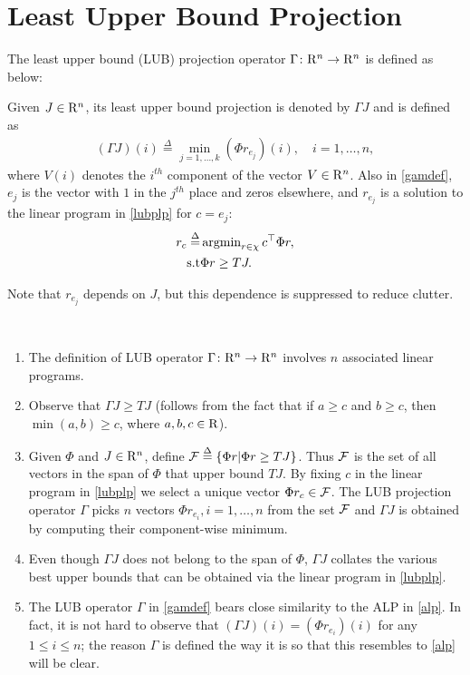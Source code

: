 \section{Least Upper Bound Projection}\label{sec:lubp}
The least upper bound (LUB) projection operator $\Gamma \colon \mathrm{R}^n \rightarrow\mathrm{R}^n$ is defined as below:
\begin{definition}\label{lubpop}
Given $J\in \mathrm{R}^n$, its least upper bound projection is denoted by $\Gamma J$ and is defined as 
\begin{align}\label{gamdef}
(\Gamma J)(i)\stackrel{\Delta}{=}\underset{j=1,\ldots,k}{\min} (\Phi r_{e_j})(i),\quad i=1,\ldots,n,
\end{align}
where $V(i)$ denotes the $i^{th}$ component of the vector $V\in \mathrm{R}^n$. Also in \eqref{gamdef}, $e_j$ is the vector with $1$ in the $j^{th}$ place and zeros elsewhere, and $r_{e_j}$ is a solution to the linear program in \eqref{lubplp} for $c=e_j$:
\begin{align}\label{lubplp}
 r_c   \stackrel{\Delta}{=}& \argmin_{r\in \chi} c^\top \Phi r,\nn\\
 \text{s.t}& \mb \Phi r\geq  TJ.
\end{align}
\end{definition}
Note that $r_{e_j}$ depends on $J$, but this dependence is suppressed to reduce clutter. 
\vspace{-10pt}
\begin{remark}
\mb\\
\vspace{-10pt}
\begin{enumerate}
\item The definition of LUB operator $\Gamma \colon \mathrm{R}^n \rightarrow \mathrm{R}^n$ involves $n$ associated linear programs.
\item Observe that $\Gamma J\geq TJ$ (follows from the fact that if $a\geq c$ and $b\geq c$, then $\min(a,b)\geq c$, where $a, b, c \in \mathrm{R}$).
\item Given $\Phi$ and $J\in \mathrm{R}^n$, define $\mathcal{F}\stackrel{\Delta}{=}\{\Phi r|\Phi r\geq TJ\}$. Thus $\mathcal{F}$ is the set of all vectors in the span of $\Phi$ that upper bound $TJ$. By fixing $c$ in the linear program in \eqref{lubplp} we select a unique vector $\Phi r_c \in \mathcal{F}$. The LUB projection operator $\Gamma$ picks $n$ vectors $\Phi r_{e_i},i=1,\ldots,n$ from the set $\mathcal{F}$ and $\Gamma J$ is obtained by computing their component-wise minimum.
\item Even though $\Gamma J$ does not belong to the span of $\Phi$, $\Gamma J$ collates the various best upper bounds that can be obtained via the linear program in \eqref{lubplp}.
\item The LUB operator $\Gamma$ in \eqref{gamdef} bears close similarity to the ALP in \eqref{alp}.
In fact, it is not hard to observe that $(\Gamma J)(i) = (\Phi r_{e_i})(i)$ for any $1\le i \le n$; the reason $\Gamma$ is defined the way it is so that this resembles to \eqref{alp} will be clear. 
\end{enumerate}
\end{remark}
